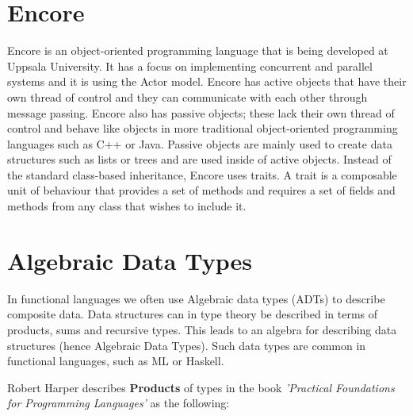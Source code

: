 \documentclass[10pt]{report}
\begin{document}
%
\label{ch:background}
%

\section{Encore}
\par{Encore is an object-oriented programming language that is being developed at Uppsala University\cite{Encore}. It has a focus on implementing concurrent and parallel systems and it is using the Actor model. Encore has active objects that have their own thread of control and they can communicate with each other through message passing. Encore also has passive objects; these lack their own thread of control and behave like objects in more traditional object-oriented programming languages such as C++ or Java. Passive objects are mainly used to create data structures such as lists or trees and are used inside of active objects. Instead of the standard class-based inheritance, Encore uses traits.  A trait is a composable unit of behaviour that provides a set of methods and requires a set of fields and methods from any class that wishes to include it.} %
\section{Algebraic Data Types}
\par{In functional languages we often use Algebraic data types (ADTs) to describe composite data. Data structures can in type theory be described in terms of products, sums and recursive types. This leads to an algebra for describing data structures (hence Algebraic Data Types). Such data types are common in functional languages, such as ML or Haskell.}

\par{Robert Harper describes \textbf{Products} of types in the book \textit{'Practical Foundations for Programming Languages'} as the following:}
\end{document}
